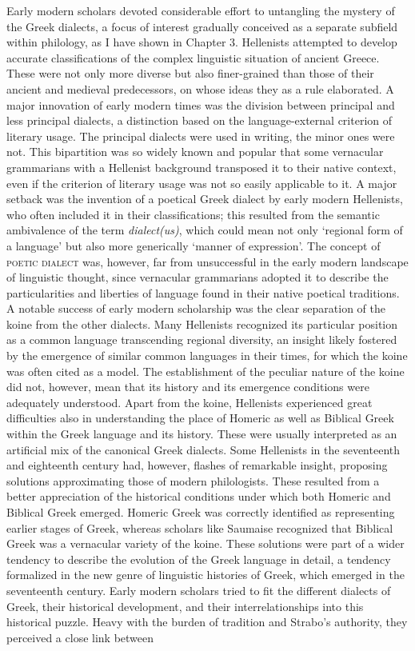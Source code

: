 \documentclass[12pt]{article}
\newenvironment{styleStandard}{\renewcommand\baselinestretch{1.25}\setlength\leftskip{0in}\setlength\rightskip{0in}\setlength\parindent{0.1972in}\setlength\parfillskip{0pt plus 1fil}\setlength\parskip{0in plus 1pt}\writerlistparindent\writerlistleftskip\leavevmode\normalfont\normalsize\writerlistlabel\ignorespaces}{\unskip\vspace{0in plus 1pt}\par}
\newcommand\writerlistleftskip{}
\newcommand\writerlistparindent{}
\newcommand\writerlistlabel{}
\begin{document}
\begin{styleStandard}
Early modern scholars devoted considerable effort to untangling the mystery of the Greek dialects, a focus of interest gradually conceived as a separate subfield within philology, as I have shown in Chapter 3. Hellenists attempted to develop accurate classifications of the complex linguistic situation of ancient Greece. These were not only more diverse but also finer-grained than those of their ancient and medieval predecessors, on whose ideas they as a rule elaborated. A major innovation of early modern times was the division between principal and less principal dialects, a distinction based on the language-external criterion of literary usage. The principal dialects were used in writing, the minor ones were not. This bipartition was so widely known and popular that some vernacular grammarians with a Hellenist background transposed it to their native context, even if the criterion of literary usage was not so easily applicable to it. A major setback was the invention of a poetical Greek dialect by early modern Hellenists, who often included it in their classifications; this resulted from the semantic ambivalence of the term \textit{dialect(us)}, which could mean not only ‘regional form of a language’ but also more generically ‘manner of expression’. The concept of \textsc{poetic dialect} was, however, far from unsuccessful in the early modern landscape of linguistic thought, since vernacular grammarians adopted it to describe the particularities and liberties of language found in their native poetical traditions. A notable success of early modern scholarship was the clear separation of the koine from the other dialects. Many Hellenists recognized its particular position as a common language transcending regional diversity, an insight likely fostered by the emergence of similar common languages in their times, for which the koine was often cited as a model. The establishment of the peculiar nature of the koine did not, however, mean that its history and its emergence conditions were adequately understood. Apart from the koine, Hellenists experienced great difficulties also in understanding the place of Homeric as well as Biblical Greek within the Greek language and its history. These were usually interpreted as an artificial mix of the canonical Greek dialects. Some Hellenists in the seventeenth and eighteenth century had, however, flashes of remarkable insight, proposing solutions approximating those of modern philologists. These resulted from a better appreciation of the historical conditions under which both Homeric and Biblical Greek emerged. Homeric Greek was correctly identified as representing earlier stages of Greek, whereas scholars like Saumaise recognized that Biblical Greek was a vernacular variety of the koine. These solutions were part of a wider tendency to describe the evolution of the Greek language in detail, a tendency formalized in the new genre of linguistic histories of Greek, which emerged in the seventeenth century. Early modern scholars tried to fit the different dialects of Greek, their historical development, and their interrelationships into this historical puzzle. Heavy with the burden of tradition and Strabo’s authority, they perceived a close link between 
\end{styleStandard}
\end{document}
